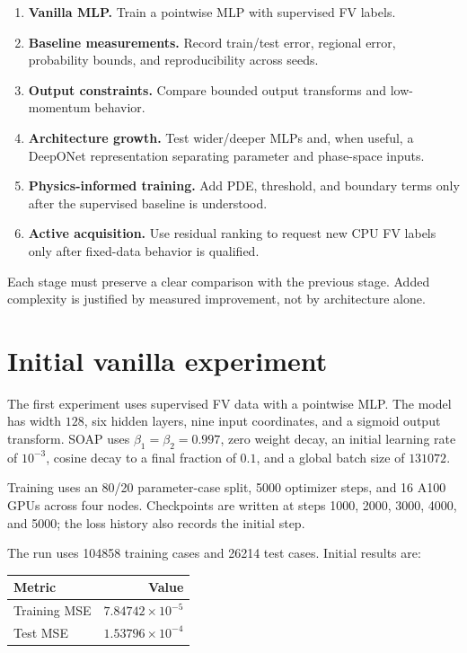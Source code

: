 \documentclass[11pt]{article}
\begin{document}
\begin{enumerate}
  \item \textbf{Vanilla MLP.} Train a pointwise MLP with supervised FV labels.
  \item \textbf{Baseline measurements.} Record train/test error, regional
        error, probability bounds, and reproducibility across seeds.
  \item \textbf{Output constraints.} Compare bounded output transforms and
        low-momentum behavior.
  \item \textbf{Architecture growth.} Test wider/deeper MLPs and, when useful,
        a DeepONet representation separating parameter and phase-space inputs.
  \item \textbf{Physics-informed training.} Add PDE, threshold, and boundary
        terms only after the supervised baseline is understood.
  \item \textbf{Active acquisition.} Use residual ranking to request new CPU
        FV labels only after fixed-data behavior is qualified.
\end{enumerate}

Each stage must preserve a clear comparison with the previous stage.  Added
complexity is justified by measured improvement, not by architecture alone.

\section{Initial vanilla experiment}

The first experiment uses supervised FV data with a pointwise MLP.  The model
has width $128$, six hidden layers, nine input coordinates, and a sigmoid
output transform.  SOAP uses $\beta_1=\beta_2=0.997$, zero weight decay, an
initial learning rate of $10^{-3}$, cosine decay to a final fraction of $0.1$,
and a global batch size of $131072$.

Training uses an 80/20 parameter-case split, 5000 optimizer steps, and 16
A100 GPUs across four nodes.  Checkpoints are written at steps 1000, 2000,
3000, 4000, and 5000; the loss history also records the initial step.

The run uses 104858 training cases and 26214 test cases.  Initial results are:
\begin{center}
\begin{tabular}{lr}
\toprule
Metric & Value \\
\midrule
Training MSE & $7.84742\times10^{-5}$ \\
Test MSE & $1.53796\times10^{-4}$ \\
\bottomrule
\end{tabular}
\end{center}
\end{document}
